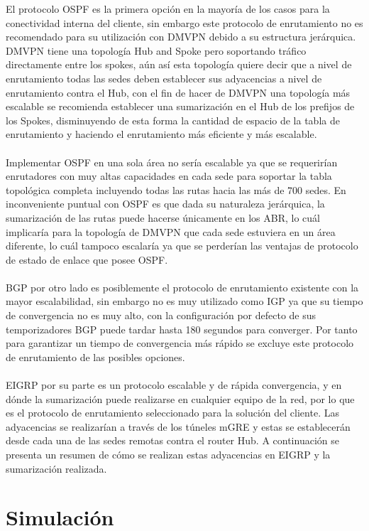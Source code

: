 El protocolo OSPF es la primera opción en la mayoría de los casos para la conectividad interna del cliente, sin embargo este protocolo de enrutamiento no es recomendado para su utilización con DMVPN debido a su estructura jerárquica. DMVPN tiene una topología Hub and Spoke pero soportando tráfico directamente entre los spokes, aún así esta topología quiere decir que a nivel de enrutamiento todas las sedes deben establecer sus adyacencias a nivel de enrutamiento contra el Hub, con el fin de hacer de DMVPN una topología más escalable se recomienda establecer una sumarización en el Hub de los prefijos de los Spokes, disminuyendo de esta forma la cantidad de espacio de la tabla de enrutamiento y haciendo el enrutamiento más eficiente y más escalable.
\\
\\
Implementar OSPF en una sola área no sería escalable ya que se requerirían enrutadores con muy altas capacidades en cada sede para soportar la tabla topológica completa incluyendo todas las rutas hacia las más de 700 sedes. En inconveniente puntual con OSPF es que dada su naturaleza jerárquica, la sumarización de las rutas puede hacerse únicamente en los ABR, lo cuál implicaría para la topología de DMVPN que cada sede estuviera en un área diferente, lo cuál tampoco escalaría ya que se perderían las ventajas de protocolo de estado de enlace que posee OSPF.
\\
\\
BGP por otro lado es posiblemente el protocolo de enrutamiento existente con la mayor escalabilidad, sin embargo no es muy utilizado como IGP ya que su tiempo de convergencia no es muy alto, con la configuración por defecto de sus temporizadores BGP puede tardar hasta 180 segundos para converger. Por tanto para garantizar un tiempo de convergencia más rápido se excluye este protocolo de enrutamiento de las posibles opciones.
\\
\\
EIGRP por su parte es un protocolo escalable y de rápida convergencia, y en dónde la sumarización puede realizarse en cualquier equipo de la red, por lo que es el protocolo de enrutamiento seleccionado para la solución del cliente. Las adyacencias se realizarían a través de los túneles mGRE y estas se establecerán desde cada una de las sedes remotas contra el router Hub. A continuación se presenta un resumen de cómo se realizan estas adyacencias en EIGRP y la sumarización realizada.

\section{Simulación} %
\label{sec:Simulación}


